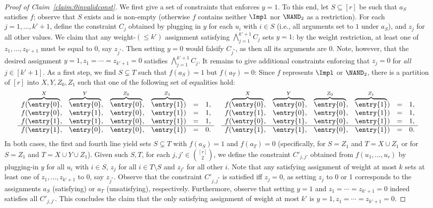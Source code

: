 \begin{proof}[Proof of Claim~\ref{claim:0invalidconst}]
%
We first give a set of constraints that enforces $y=1$. To this end, let $S\subseteq [r]$ be such that $a_S$ satisfies $f$; observe that $S$ exists and is non-empty (otherwise $f$ contains neither $\Impl$ nor $\NAND_{2}$ as a restriction). For each $j=1,\dots,k'+1$, define the constraint $C_j$ obtained by plugging in $y$ for each $u_i$ with $i\in S$ (i.e., all arguments set to $1$ under $a_S$), and $z_j$ for all other values. We claim that any weight-$(\le k')$ assignment satisfying $\bigwedge_{j=1}^{k'+1} C_j$ sets $y=1$: by the weight restriction, at least one of $z_{1},\dots,z_{k'+1}$ must be equal to $0$, say $z_{j^*}$. Then setting $y=0$ would falsify $C_{j^*}$, as then all its arguments are $0$. Note, however, that the desired assignment $y=1, z_1=\cdots=z_{k'+1}=0$ satisfies $\bigwedge_{j=1}^{k'+1} C_j$.
%
It remains to give additional constraints enforcing that $z_j = 0$ for \emph{all} $j\in [k'+1]$. As a first step, we find $S\subsetneq T$ such that $f(a_S)=1$ but $f(a_T)= 0$: Since $f$ represents $\Impl$ or $\NAND_2$, there is a partition of $[r]$ into $X, Y, Z_0, Z_1$ such that one of the following set of equalities hold:
\[
\begin{matrix}
f( \overbrace{\entry{0}}^{X},& \overbrace{\entry{0}}^{Y}, & \overbrace{\entry{0}}^{Z_0}, & \overbrace{\entry{1}}^{Z_1}) & = & 1,\\
f( \entry{0},& \entry{1}, & \entry{0}, & \entry{1}) & = & 1,\\
f( \entry{1},& \entry{1}, & \entry{0}, & \entry{1}) & = & 1,\\
  \hline
f( \entry{1},& \entry{0}, & \entry{0}, & \entry{1}) & = & 0.
\end{matrix}
\qquad 
\begin{matrix}
f( \overbrace{\entry{0}}^{X},& \overbrace{\entry{0}}^{Y}, & \overbrace{\entry{0}}^{Z_0}, & \overbrace{\entry{1}}^{Z_1}) & = & 1,\\
f( \entry{1},& \entry{0}, & \entry{0}, & \entry{1}) & = & 1,\\
f( \entry{0},& \entry{1}, & \entry{0}, & \entry{1}) & = & 1,\\
  \hline
f( \entry{1},& \entry{1}, & \entry{0}, & \entry{1}) & = & 0.
\end{matrix}
\]
In both cases, the first and fourth line yield sets $S \subsetneq T$ with $f(a_S)=1$ and $f(a_T)=0$ (specifically, for $S=Z_1$ and $T=X \cup Z_1$ or for $S=Z_1$ and $T=X \cup Y \cup Z_1$).
%
Given such $S,T$, for each $j,j' \in {[r] \choose 2}$, we define the constraint $C'_{j,j'}$ obtained from $f(u_1,\dots,u_r)$ by plugging-in $y$ for all $u_i$ with $i\in S$, $z_j$ for all $i\in T\setminus S$ and $z_{j'}$ for all other $i$. Note that any satisfying assignment of weight at most $k$ sets at least one of $z_1,\dots, z_{k'+1}$ to $0$, say $z_{j^*}$. Observe that the constraint $C'_{j,j^*}$ is satisfied iff $z_j=0$, as setting $z_j$ to 0 or 1 corresponds to the assignments $a_S$ (satisfying) or $a_T$ (unsatisfying), respectively. Furthermore, observe that setting $y=1$ and $z_1=\cdots = z_{k'+1}=0$ indeed satisfies all $C'_{j,j'}$.
This concludes the claim that the only satisfying assignment of weight at most $k'$ is $y=1, z_1=\cdots = z_{k'+1} = 0$.
\end{proof}
%
%
